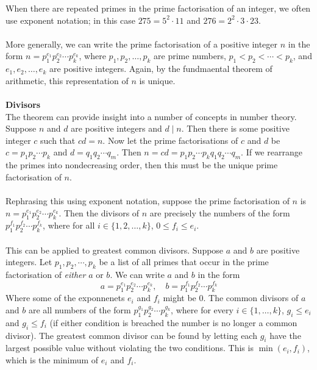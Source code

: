 \documentclass{report}
\theoremstyle{definition}
\begin{document}
When there are repeated primes in the prime factorisation of an integer, we often use exponent notation; in this case $275=5^2\cdot11$ and $276=2^2\cdot3\cdot23$.\\
\vspace{1mm}\\
More generally, we can write the prime factorisation of a positive integer $n$ in the form 
$n=p_1^{e_1}p_2^{e_2}\cdots p_k^{e_k}$, where $p_1,p_2,\ldots,p_k$ are prime numbers, 
$p_1<p_2<\cdots<p_k$, and $e_1,e_2,\ldots,e_k$ are positive integers. Again, by the fundmaental theorem of arithmetic, this representation of $n$ is unique.\\
\vspace{1mm}\\
\textbf{Divisors}\\
The theorem can provide insight into a number of concepts in number theory. Suppose $n$ and $d$ are positive integers and $d\mid n$. Then there is some positive integer $c$ such that $cd=n$.
Now let the prime factorisations of $c$ and $d$ be $c=p_1p_2\cdots p_k$ and $d=q_1q_2\cdots q_m$. Then $n=cd=p_1p_2\cdots p_kq_1q_2\cdots q_m$. If we rearrange the primes
into nondecreasing order, then this must be the unique prime factorisation of $n$.\\
\vspace{1mm}\\
Rephrasing this using exponent notation, suppose the prime factorisation of $n$ is $n=p_1^{e_1}p_2^{e_2}\cdots p_k^{e_k}$. Then the divisors of $n$ are precisely the numbers of the form $p_1^{f_1}p_2^{f_2}\cdots p_k^{f_k}$, where for all $i\in\{1,2,\ldots,k\}$, $0\leq f_i\leq e_i$.\\
\vspace{1mm}\\
This can be applied to greatest common divisors. Suppose $a$ and $b$ are positive integers. Let $p_1,p_2,\cdots,p_k$ be a list of all primes that occur in the prime factorisation of \textit{either}
$a$ or $b$. We can write $a$ and $b$ in the form
\begin{equation*}
a=p_1^{e_1}p_2^{e_2}\cdots p_k^{e_k},\quad b=p_1^{f_1}p_2^{f_2}\cdots p_k^{f_k}
\end{equation*}
Where some of the exponnenets $e_i$ and $f_i$ might be 0. The common divisors of $a$ and $b$ are all numbers of the form $p_1^{g_1}p_2^{g_2}\cdots p_k^{g_k}$, where for every 
$i\in\{1,\ldots,k\}$, $g_i\leq e_i$ and $g_i\leq f_i$ (if either condition is breached the number is no longer a common divisor). 
The greatest common divisor can be found by letting each $g_i$ have the largest possible value without violating the two conditions. This is $\min(e_i,f_i)$, which is the minimum of $e_i$ and $f_i$.
\end{document}
